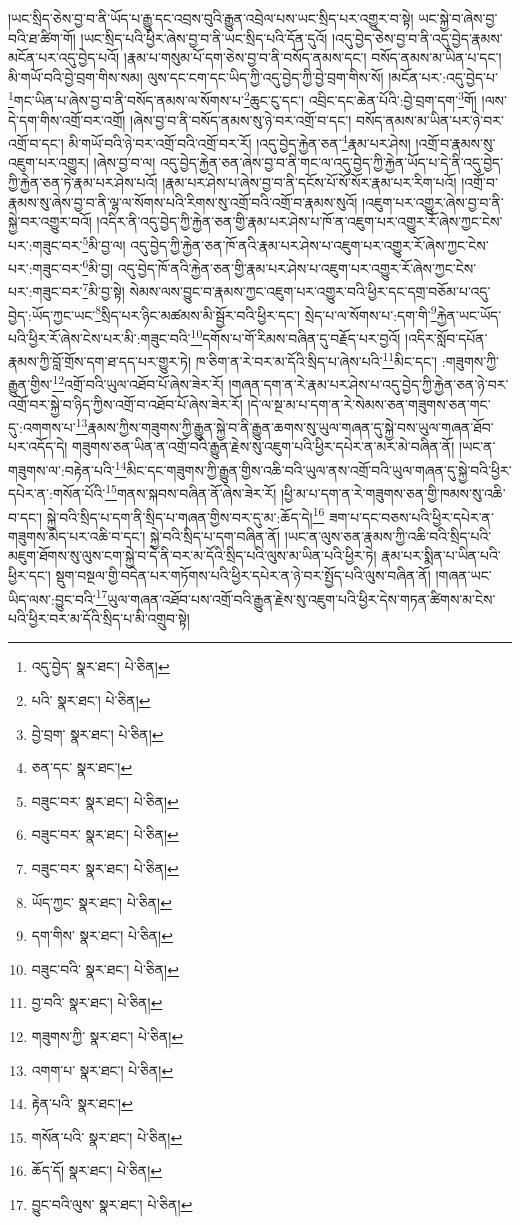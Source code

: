 །ཡང་སྲིད་ཅེས་བྱ་བ་ནི་ཡོད་པ་རྒྱུ་དང་འབྲས་བུའི་རྒྱུན་འབྲེལ་པས་ཡང་སྲིད་པར་འགྱུར་བ་སྟེ། ཡང་སྐྱེ་བ་ཞེས་བྱ་བའི་ཐ་ཚིག་གོ། །ཡང་སྲིད་པའི་ཕྱིར་ཞེས་བྱ་བ་ནི་ཡང་སྲིད་པའི་དོན་དུའོ། །འདུ་བྱེད་ཅེས་བྱ་བ་ནི་འདུ་བྱེད་རྣམས་མངོན་པར་འདུ་བྱེད་པའོ། །རྣམ་པ་གསུམ་པོ་དག་ཅེས་བྱ་བ་ནི་བསོད་ནམས་དང་། བསོད་ནམས་མ་ཡིན་པ་དང་། མི་གཡོ་བའི་བྱེ་བྲག་གིས་སམ། ལུས་དང་ངག་དང་ཡིད་ཀྱི་འདུ་བྱེད་ཀྱི་བྱེ་བྲག་གིས་སོ། །མངོན་པར་:འདུ་བྱེད་པ་\footnote{འདུ་བྱེད་  སྣར་ཐང་།  པེ་ཅིན། }གང་ཡིན་པ་ཞེས་བྱ་བ་ནི་བསོད་ནམས་ལ་སོགས་པ་\footnote{པའི་  སྣར་ཐང་།  པེ་ཅིན། }ཆུང་ངུ་དང་། འབྲིང་དང་ཆེན་པོའི་:བྱེ་བྲག་དག་\footnote{བྱེ་བྲག་  སྣར་ཐང་།  པེ་ཅིན། }གོ། །ལས་དེ་དག་གིས་འགྲོ་བར་འགྲོ། །ཞེས་བྱ་བ་ནི་བསོད་ནམས་སུ་ཉེ་བར་འགྲོ་བ་དང་། བསོད་ནམས་མ་ཡིན་པར་ཉེ་བར་འགྲོ་བ་དང་། མི་གཡོ་བའི་ཉེ་བར་འགྲོ་བའི་འགྲོ་བར་རོ། །འདུ་བྱེད་རྐྱེན་ཅན་\footnote{ཅན་དང་  སྣར་ཐང་། }རྣམ་པར་ཤེས། །འགྲོ་བ་རྣམས་སུ་འཇུག་པར་འགྱུར། །ཞེས་བྱ་བ་ལ། འདུ་བྱེད་རྐྱེན་ཅན་ཞེས་བྱ་བ་ནི་གང་ལ་འདུ་བྱེད་ཀྱི་རྐྱེན་ཡོད་པ་དེ་ནི་འདུ་བྱེད་ཀྱི་རྐྱེན་ཅན་ཏེ་རྣམ་པར་ཤེས་པའོ། །རྣམ་པར་ཤེས་པ་ཞེས་བྱ་བ་ནི་དངོས་པོ་སོ་སོར་རྣམ་པར་རིག་པའོ། །འགྲོ་བ་རྣམས་སུ་ཞེས་བྱ་བ་ནི་ལྷ་ལ་སོགས་པའི་རིགས་སུ་འགྲོ་བའི་འགྲོ་བ་རྣམས་སུའོ། །འཇུག་པར་འགྱུར་ཞེས་བྱ་བ་ནི་སྐྱེ་བར་འགྱུར་བའོ། །འདིར་ནི་འདུ་བྱེད་ཀྱི་རྐྱེན་ཅན་གྱི་རྣམ་པར་ཤེས་པ་ཁོ་ན་འཇུག་པར་འགྱུར་རོ་ཞེས་ཀྱང་ངེས་པར་:གཟུང་བར་\footnote{བཟུང་བར་  སྣར་ཐང་།  པེ་ཅིན། }མི་བྱ་ལ། འདུ་བྱེད་ཀྱི་རྐྱེན་ཅན་ཁོ་ནའི་རྣམ་པར་ཤེས་པ་འཇུག་པར་འགྱུར་རོ་ཞེས་ཀྱང་ངེས་པར་:གཟུང་བར་\footnote{བཟུང་བར་  སྣར་ཐང་།  པེ་ཅིན། }མི་བྱ། འདུ་བྱེད་ཁོ་ནའི་རྐྱེན་ཅན་གྱི་རྣམ་པར་ཤེས་པ་འཇུག་པར་འགྱུར་རོ་ཞེས་ཀྱང་ངེས་པར་:གཟུང་བར་\footnote{བཟུང་བར་  སྣར་ཐང་།  པེ་ཅིན། }མི་བྱ་སྟེ། སེམས་ལས་བྱུང་བ་རྣམས་ཀྱང་འཇུག་པར་འགྱུར་བའི་ཕྱིར་དང་དགྲ་བཅོམ་པ་འདུ་བྱེད་:ཡོད་ཀྱང་ཡང་\footnote{ཡོད་ཀྱང་  སྣར་ཐང་།  པེ་ཅིན། }སྲིད་པར་ཉིང་མཚམས་མི་སྦྱོར་བའི་ཕྱིར་དང་། སྲེད་པ་ལ་སོགས་པ་:དག་གི་\footnote{དག་གིས་  སྣར་ཐང་།  པེ་ཅིན། }རྐྱེན་ཡང་ཡོད་པའི་ཕྱིར་རོ་ཞེས་ངེས་པར་མི་:གཟུང་བའི་\footnote{བཟུང་བའི་  སྣར་ཐང་།  པེ་ཅིན། }དགོས་པ་གོ་རིམས་བཞིན་དུ་བརྗོད་པར་བྱའོ། །འདིར་སློབ་དཔོན་རྣམས་ཀྱི་བློ་གྲོས་དག་ཐ་དད་པར་གྱུར་ཏེ། ཁ་ཅིག་ན་རེ་བར་མ་དོའི་སྲིད་པ་ཞེས་པའི་\footnote{བྱ་བའི་  སྣར་ཐང་།  པེ་ཅིན། }མིང་དང་། :གཟུགས་ཀྱི་རྒྱུན་གྱིས་\footnote{གཟུགས་ཀྱི་  སྣར་ཐང་།  པེ་ཅིན། }འགྲོ་བའི་ཡུལ་འཐོབ་པོ་ཞེས་ཟེར་རོ། །གཞན་དག་ན་རེ་རྣམ་པར་ཤེས་པ་འདུ་བྱེད་ཀྱི་རྐྱེན་ཅན་ཉེ་བར་འགྲོ་བར་སྐྱེ་བ་ཉིད་ཀྱིས་འགྲོ་བ་འཐོབ་པོ་ཞེས་ཟེར་རོ། །དེ་ལ་སྔ་མ་པ་དག་ན་རེ་སེམས་ཅན་གཟུགས་ཅན་གང་དུ་:འགགས་པ་\footnote{འགག་པ་  སྣར་ཐང་།  པེ་ཅིན། }རྣམས་ཀྱིས་གཟུགས་ཀྱི་རྒྱུན་སྐྱེ་བ་ནི་རྒྱུན་ཆགས་སུ་ཡུལ་གཞན་དུ་སྐྱེ་བས་ཡུལ་གཞན་ཐོབ་པར་འདོད་དེ། གཟུགས་ཅན་ཡིན་ན་འགྲོ་བའི་རྒྱུན་རྗེས་སུ་འཇུག་པའི་ཕྱིར་དཔེར་ན་མར་མེ་བཞིན་ནོ། །ཡང་ན་གཟུགས་ལ་:བརྟེན་པའི་\footnote{རྟེན་པའི་  སྣར་ཐང་། }མིང་དང་གཟུགས་ཀྱི་རྒྱུན་གྱིས་འཆི་བའི་ཡུལ་ནས་འགྲོ་བའི་ཡུལ་གཞན་དུ་སྐྱེ་བའི་ཕྱིར་དཔེར་ན་:གསོན་པོའི་\footnote{གསོན་པའི་  སྣར་ཐང་།  པེ་ཅིན། }གནས་སྐབས་བཞིན་ནོ་ཞེས་ཟེར་རོ། །ཕྱི་མ་པ་དག་ན་རེ་གཟུགས་ཅན་གྱི་ཁམས་སུ་འཆི་བ་དང་། སྐྱེ་བའི་སྲིད་པ་དག་ནི་སྲིད་པ་གཞན་གྱིས་བར་དུ་མ་:ཆོད་དེ།\footnote{ཆོད་དོ།  སྣར་ཐང་།  པེ་ཅིན། } ཟག་པ་དང་བཅས་པའི་ཕྱིར་དཔེར་ན་གཟུགས་མེད་པར་འཆི་བ་དང་། སྐྱེ་བའི་སྲིད་པ་དག་བཞིན་ནོ། །ཡང་ན་ལུས་ཅན་རྣམས་ཀྱི་འཆི་བའི་སྲིད་པའི་མཇུག་ཐོགས་སུ་ལུས་ངག་སྐྱེ་བ་དེ་ནི་བར་མ་དོའི་སྲིད་པའི་ལུས་མ་ཡིན་པའི་ཕྱིར་ཏེ། རྣམ་པར་སྨིན་པ་ཡིན་པའི་ཕྱིར་དང་། སྡུག་བསྔལ་གྱི་བདེན་པར་གཏོགས་པའི་ཕྱིར་དཔེར་ན་ཉེ་བར་སྤྱོད་པའི་ལུས་བཞིན་ནོ། །གཞན་ཡང་ཡིད་ལས་:བྱུང་བའི་\footnote{བྱུང་བའི་ལུས་  སྣར་ཐང་།  པེ་ཅིན། }ཡུལ་གཞན་འཐོབ་པས་འགྲོ་བའི་རྒྱུན་རྗེས་སུ་འཇུག་པའི་ཕྱིར་དེས་གཏན་ཚིགས་མ་ངེས་པའི་ཕྱིར་བར་མ་དོའི་སྲིད་པ་མི་འགྲུབ་སྟེ། 